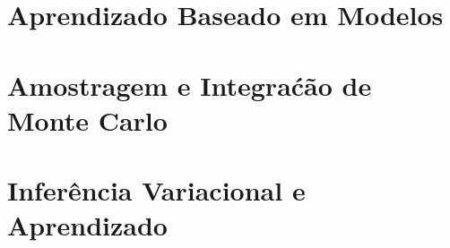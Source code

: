 \documentclass[11pt,a4paper,twoside,openright]{book}
\begin{document}
\chapter{Aprendizado Baseado em Modelos} 
\minitoc


\chapter{Amostragem e Integra\'c\~ao de Monte Carlo}
\minitoc


\chapter{Infer\^encia Variacional e Aprendizado}
\minitoc



\end{document}
